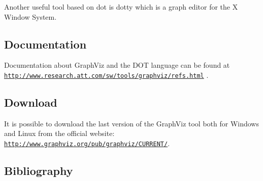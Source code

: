 Another useful tool based on {\ttfamily dot} is {\ttfamily dotty} which is a graph editor for the X Window System.\hypertarget{panda_sdk_graphviz_documentation}{}\subsection{Documentation}\label{panda_sdk_graphviz_documentation}
Documentation about Graph\+Viz and the D\+OT language can be found at \href{http://www.research.att.com/sw/tools/graphviz/refs.html}{\tt http\+://www.\+research.\+att.\+com/sw/tools/graphviz/refs.\+html} .\hypertarget{panda_sdk_graphviz_download}{}\subsection{Download}\label{panda_sdk_graphviz_download}
It is possible to download the last version of the Graph\+Viz tool both for Windows and Linux from the official website\+: \href{http://www.graphviz.org/pub/graphviz/CURRENT/}{\tt http\+://www.\+graphviz.\+org/pub/graphviz/\+C\+U\+R\+R\+E\+N\+T/}. \hypertarget{panda_sdk_graphviz_bibliography}{}\subsection{Bibliography}\label{panda_sdk_graphviz_bibliography}

